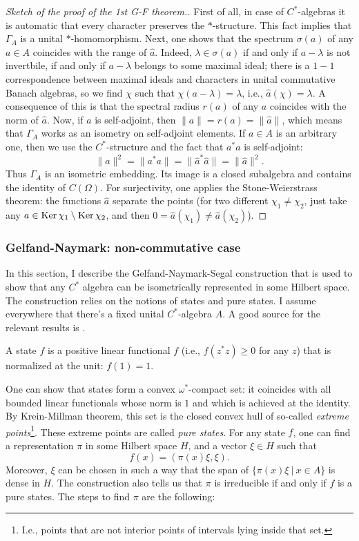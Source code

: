 \begin{proof}[Sketch of the proof of the 1st G-F theorem.]
First of all, in case of $C^*$-algebras it is automatic that every character preserves the $\ast$-structure. This fact implies that $\Gamma_A$ is a unital $\ast$-homomorphism. Next, one shows that the spectrum $\sigma(a)$ of any $a \in A$ coincides with the range of $\hat{a}$. Indeed, $\lambda \in \sigma(a)$ if and only if $a-\lambda$ is not invertbile, if and only if $a-\lambda$ belongs to some maximal ideal; there is a $1-1$ correspondence between maximal ideals and characters in unital commutative Banach algebras, so we find $\chi$ such that $\chi(a-\lambda) = \lambda$, i.e., $\hat{a}(\chi) = \lambda$. A consequence of this is that the spectral radius $r(a)$ of any $a$ coincides with the norm of $\hat{a}$. Now, if $a$ is self-adjoint, then $\|a\| = r(a) = \|\hat{a}\|$, which means that $\Gamma_A$ works as an isometry on self-adjoint elements. If $a \in A$ is an arbitrary one, then we use the $C^*$-structure and the fact that $a^*a$ is self-adjoint:
\[
\|a\|^2 = \|a^* a\| = \|\hat{a}^* \hat{a}\| = \|\hat{a}\|^2.
\]
Thus $\Gamma_A$ is an isometric embedding. Its image is a closed subalgebra and contains the identity of $C(\Omega)$. For surjectivity, one applies the Stone-Weierstrass theorem: the functions $\hat{a}$ separate the points (for two different $\chi_1 \neq \chi_2$, just take any $a \in \operatorname{Ker} \chi_1 \setminus \operatorname{Ker} \chi_2$, and then $0 = \hat{a}(\chi_1) \neq \hat{a}(\chi_2)$).
\end{proof}

\subsubsection{Gelfand-Naymark: non-commutative case}
In this section, I describe the Gelfand-Naymark-Segal construction that is used to show that any $C^*$ algebra can be isometrically represented in some Hilbert space. The construction relies on the notions of states and pure states. I assume everywhere that there's a fixed unital $C^*$-algebra $A$. A good source for the relevant results is \cite{arveson}.
\begin{definition}
A state $f$ is a positive linear functional $f$ (i.e., $f(z^*z) \geq 0$ for any $z$) that is normalized at the unit: $f(1) = 1$. 
\end{definition}
One can show that states form a convex $\omega^*$-compact set: it coincides with all bounded linear functionals whose norm is $1$ and which is achieved at the identity. By Krein-Millman theorem, this set is the closed convex hull of so-called \emph{extreme points}\footnote{I.e., points that are not interior points of intervals lying inside that set.}. These extreme points are called \emph{pure states}. For any state $f$, one can find a representation $\pi$ in some Hilbert space $H$, and a vector $\xi \in H$ such that 
\[
f(x) = (\pi(x)\xi,\xi).
\]
Moreover, $\xi$ can be chosen in such a way that the span of $\{\pi(x)\xi \ | \ x \in A\}$ is dense in $H$. The construction also tells us that $\pi$ is irreducible if and only if $f$ is a pure states. The steps to find $\pi$ are the following:

